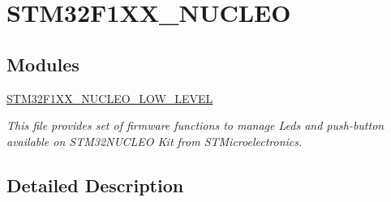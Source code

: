\hypertarget{group___s_t_m32_f1_x_x___n_u_c_l_e_o}{}\section{S\+T\+M32\+F1\+X\+X\+\_\+\+N\+U\+C\+L\+EO}
\label{group___s_t_m32_f1_x_x___n_u_c_l_e_o}
\subsection*{Modules}
\begin{DoxyCompactItemize}
\item 
\mbox{\hyperlink{group___s_t_m32_f1_x_x___n_u_c_l_e_o___l_o_w___l_e_v_e_l}{S\+T\+M32\+F1\+X\+X\+\_\+\+N\+U\+C\+L\+E\+O\+\_\+\+L\+O\+W\+\_\+\+L\+E\+V\+EL}}
\begin{DoxyCompactList}\small\item\em This file provides set of firmware functions to manage Leds and push-\/button available on S\+T\+M32\+N\+U\+C\+L\+EO Kit from S\+T\+Microelectronics. \end{DoxyCompactList}\end{DoxyCompactItemize}


\subsection{Detailed Description}
